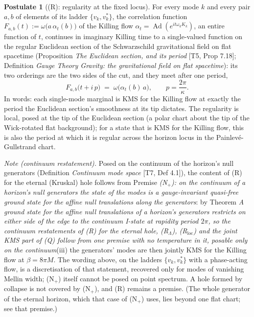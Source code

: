 \documentclass[11pt]{article}
\theoremstyle{definition}
\newtheorem{postulate}[theorem]{Postulate}
\theoremstyle{plain}
\begin{document}
\begin{postulate}[(R): regularity at the fixed locus]\label{c:singularity.r-regularity-fixed-locus}
For every mode $k$ and every pair $a, b$ of elements of its ladder $\{v_k, v_k^{*}\}$, the correlation function $F_{a,b}(t) := \omega\bigl(a\,\alpha_t(b)\bigr)$ of the Killing flow $\alpha_t = \operatorname{Ad}(e^{it\omega_k K_k})$, an entire function of $t$, continues in imaginary Killing time to a single-valued function on the regular Euclidean section of the Schwarzschild gravitational field on flat spacetime (Proposition \emph{The Euclidean section, and its period} [T5, Prop 7.18]; Definition \emph{Gauge Theory Gravity: the gravitational field on flat spacetime}): its two orderings are the two sides of the cut, and they meet after one period,
\[
F_{a,b}\bigl(t + i\,p\bigr) \;=\; \omega\bigl(\alpha_t(b)\,a\bigr), \qquad p = \frac{2\pi}{\kappa} .
\]
In words: each single-mode marginal is KMS for the Killing flow at exactly the period the Euclidean section's smoothness at its tip dictates. The regularity is local, posed at the tip of the Euclidean section (a polar chart about the tip of the Wick-rotated flat background); for a state that is KMS for the Killing flow, this is also the period at which it is regular across the horizon locus in the Painlev\'e-Gullstrand chart.

\emph{Note (continuum restatement).} Posed on the continuum of the horizon's null generators (Definition \emph{Continuum mode space} [T7, Def 4.1]), the content of (R) for the eternal (Kruskal) hole follows from Premise \emph{(N$_{+}$): on the continuum of a horizon's null generators the state of the modes is a gauge-invariant quasi-free ground state for the affine null translations along the generators}: by Theorem \emph{A ground state for the affine null translations of a horizon's generators restricts on either side of the edge to the continuum I-state at rapidity period $2\pi$, so the continuum restatements of (R) for the eternal hole, (R$_{\Lambda}$), (R$_{\mathrm{loc}}$) and the joint KMS part of (Q) follow from one premise with no temperature in it, posable only on the continuum}(iii) the generators' modes are then jointly KMS for the Killing flow at $\beta = 8\pi M$. The wording above, on the ladders $\{v_{k}, v_{k}^{*}\}$ with a phase-acting flow, is a discretisation of that statement, recovered only for modes of vanishing Mellin width; (N$_{+}$) itself cannot be posed on point spectrum. A hole formed by collapse is not covered by (N$_{+}$), and (R) remains a premise. (The whole generator of the eternal horizon, which that case of (N$_{+}$) uses, lies beyond one flat chart; see that premise.)
\end{postulate}
\end{document}
